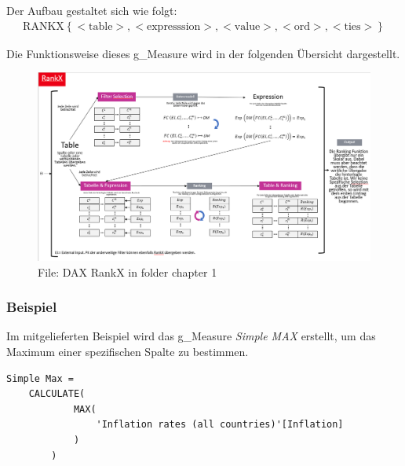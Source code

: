 Der Aufbau gestaltet sich wie folgt:
\begin{align*}
	\text{RANKX} \left\lbrace <\text{table}>,<\text{expresssion}>,<\text{value}>,<\text{ord}>,<\text{ties}>\right\rbrace
\end{align*}

Die Funktionsweise dieses \gls{g_Measure} wird in der folgenden Übersicht dargestellt.

\begin{figure}[H]
	\centering
	\includegraphics[scale = 0.3]{attachment/chapter_1/Scc148}
	\caption{File: DAX RankX in folder chapter 1}
\end{figure}

\subsubsection{Beispiel}
Im mitgelieferten Beispiel wird das \gls{g_Measure} \textit{Simple MAX} erstellt, um das Maximum einer spezifischen Spalte zu bestimmen.

\begin{lstlisting}[style=DAX]
Simple Max = 
	CALCULATE(
			MAX(
				'Inflation rates (all countries)'[Inflation]
			)
		)
\end{lstlisting}

